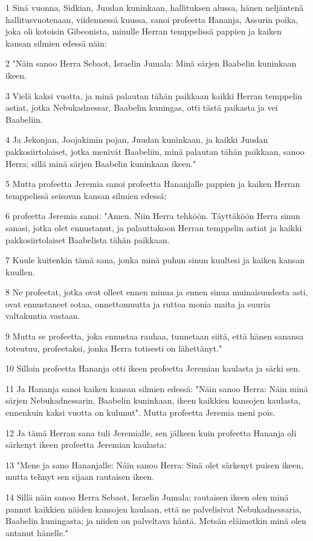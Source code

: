 \par 1 Sinä vuonna, Sidkian, Juudan kuninkaan, hallituksen alussa, hänen neljäntenä hallitusvuotenaan, viidennessä kuussa, sanoi profeetta Hananja, Assurin poika, joka oli kotoisin Gibeonista, minulle Herran temppelissä pappien ja kaiken kansan silmien edessä näin:
\par 2 "Näin sanoo Herra Sebaot, Israelin Jumala: Minä särjen Baabelin kuninkaan ikeen.
\par 3 Vielä kaksi vuotta, ja minä palautan tähän paikkaan kaikki Herran temppelin astiat, jotka Nebukadnessar, Baabelin kuningas, otti tästä paikasta ja vei Baabeliin.
\par 4 Ja Jekonjan, Joojakimin pojan, Juudan kuninkaan, ja kaikki Juudan pakkosiirtolaiset, jotka menivät Baabeliin, minä palautan tähän paikkaan, sanoo Herra; sillä minä särjen Baabelin kuninkaan ikeen."
\par 5 Mutta profeetta Jeremia sanoi profeetta Hananjalle pappien ja kaiken Herran temppelissä seisovan kansan silmien edessä;
\par 6 profeetta Jeremia sanoi: "Amen. Niin Herra tehköön. Täyttäköön Herra sinun sanasi, jotka olet ennustanut, ja palauttakoon Herran temppelin astiat ja kaikki pakkosiirtolaiset Baabelista tähän paikkaan.
\par 7 Kuule kuitenkin tämä sana, jonka minä puhun sinun kuultesi ja kaiken kansan kuullen.
\par 8 Ne profeetat, jotka ovat olleet ennen minua ja ennen sinua muinaisuudesta asti, ovat ennustaneet sotaa, onnettomuutta ja ruttoa monia maita ja suuria valtakuntia vastaan.
\par 9 Mutta se profeetta, joka ennustaa rauhaa, tunnetaan siitä, että hänen sanansa toteutuu, profeetaksi, jonka Herra totisesti on lähettänyt."
\par 10 Silloin profeetta Hananja otti ikeen profeetta Jeremian kaulasta ja särki sen.
\par 11 Ja Hananja sanoi kaiken kansan silmien edessä: "Näin sanoo Herra: Näin minä särjen Nebukadnessarin, Baabelin kuninkaan, ikeen kaikkien kansojen kaulasta, ennenkuin kaksi vuotta on kulunut". Mutta profeetta Jeremia meni pois.
\par 12 Ja tämä Herran sana tuli Jeremialle, sen jälkeen kuin profeetta Hananja oli särkenyt ikeen profeetta Jeremian kaulasta:
\par 13 "Mene ja sano Hananjalle: Näin sanoo Herra: Sinä olet särkenyt puisen ikeen, mutta tehnyt sen sijaan rautaisen ikeen.
\par 14 Sillä näin sanoo Herra Sebaot, Israelin Jumala: rautaisen ikeen olen minä pannut kaikkien näiden kansojen kaulaan, että ne palvelisivat Nebukadnessaria, Baabelin kuningasta; ja niiden on palveltava häntä. Metsän eläimetkin minä olen antanut hänelle."
